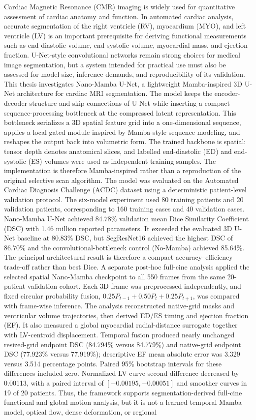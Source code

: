 Cardiac Magnetic Resonance (CMR) imaging is widely used for quantitative assessment of cardiac anatomy and function. In automated cardiac analysis, accurate segmentation of the right ventricle (RV), myocardium (MYO), and left ventricle (LV) is an important prerequisite for deriving functional measurements such as end-diastolic volume, end-systolic volume, myocardial mass, and ejection fraction. U-Net-style convolutional networks remain strong choices for medical image segmentation, but a system intended for practical use must also be assessed for model size, inference demands, and reproducibility of its validation. This thesis investigates Nano-Mamba U-Net, a lightweight Mamba-inspired 3D U-Net architecture for cardiac MRI segmentation. The model keeps the encoder-decoder structure and skip connections of U-Net while inserting a compact sequence-processing bottleneck at the compressed latent representation. This bottleneck serializes a 3D spatial feature grid into a one-dimensional sequence, applies a local gated module inspired by Mamba-style sequence modeling, and reshapes the output back into volumetric form. The trained backbone is spatial: tensor depth denotes anatomical slices, and labelled end-diastolic (ED) and end-systolic (ES) volumes were used as independent training samples. The implementation is therefore Mamba-inspired rather than a reproduction of the original selective scan algorithm. The model was evaluated on the Automated Cardiac Diagnosis Challenge (ACDC) dataset using a deterministic patient-level validation protocol. The six-model experiment used 80 training patients and 20 validation patients, corresponding to 160 training cases and 40 validation cases. Nano-Mamba U-Net achieved 84.78\% validation mean Dice Similarity Coefficient (DSC) with 1.46 million reported parameters. It exceeded the evaluated 3D U-Net baseline at 80.83\% DSC, but SegResNet16 achieved the highest DSC of 86.70\% and the convolutional-bottleneck control (No-Mamba) achieved 85.64\%. The principal architectural result is therefore a compact accuracy--efficiency trade-off rather than best Dice. A separate post-hoc full-cine analysis applied the selected spatial Nano-Mamba checkpoint to all 550 frames from the same 20-patient validation cohort. Each 3D frame was preprocessed independently, and fixed circular probability fusion, $0.25P_{t-1}+0.50P_t+0.25P_{t+1}$, was compared with frame-wise inference. The analysis reconstructed native-grid masks and ventricular volume trajectories, then derived ED/ES timing and ejection fraction (EF). It also measured a global myocardial radial-distance surrogate together with LV-centroid displacement. Temporal fusion produced nearly unchanged resized-grid endpoint DSC (84.794\% versus 84.779\%) and native-grid endpoint DSC (77.923\% versus 77.919\%); descriptive EF mean absolute error was 3.329 versus 3.514 percentage points. Paired 95\% bootstrap intervals for these differences included zero. Normalized LV-curve second difference decreased by 0.00113, with a paired interval of $[-0.00195,-0.00051]$ and smoother curves in 19 of 20 patients. Thus, the framework supports segmentation-derived full-cine functional and global motion analysis, but it is not a learned temporal Mamba model, optical flow, dense deformation, or regional 